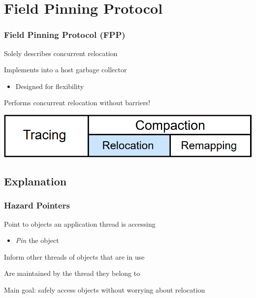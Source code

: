 \documentclass{beamer}
\newcommand{\linespace}{\vskip 0.25cm}
\begin{document}
\section[FPP]{Field Pinning Protocol}

\begin{frame}

\frametitle{Field Pinning Protocol (FPP)}

Solely describes concurrent relocation

\linespace
\linespace

Implements into a host garbage collector
\begin{itemize}
\item Designed for flexibility
\end{itemize}

\linespace
\linespace

Performs concurrent relocation without barriers!

\linespace
\linespace
\linespace
\linespace

\begin{center}
\includegraphics[width=.85\textwidth]{Illustrations/gc_cycle_locator_relocation.png}
\end{center}

\end{frame}



\subsection*{Explanation}

\begin{frame}

\frametitle{Hazard Pointers}

Point to objects an application thread is accessing
\begin{itemize}
\item \emph{Pin} the object
\end{itemize}

\linespace
\linespace

Inform other threads of objects that are in use

\linespace
\linespace

Are maintained by the thread they belong to

\linespace
\linespace

Main goal: safely access objects without worrying about relocation



\end{frame}
\end{document}
